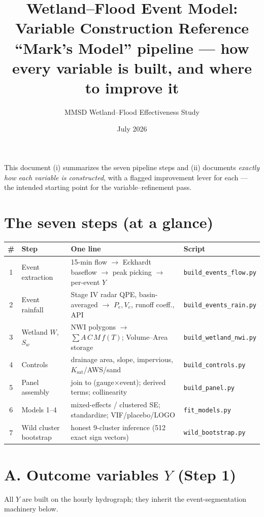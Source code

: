 \documentclass[11pt]{article}
\title{\textbf{Wetland--Flood Event Model: Variable Construction Reference}\\[3pt]
\large ``Mark's Model'' pipeline --- how every variable is built, and where to improve it}
\author{MMSD Wetland--Flood Effectiveness Study}
\date{July 2026}
\begin{document}
\maketitle
\vspace{-1.2em}
\noindent\small This document (i) summarizes the seven pipeline steps and (ii) documents
\emph{exactly how each variable is constructed}, with a flagged improvement lever for each ---
the intended starting point for the variable--refinement pass. \normalsize

\section{The seven steps (at a glance)}
\begin{table}[htbp]\centering\small
\begin{tabular}{clll}
\toprule
\# & Step & One line & Script \\
\midrule
1 & Event extraction & 15-min flow $\to$ Eckhardt baseflow $\to$ peak picking $\to$ per-event $Y$ & \texttt{build\_events\_flow.py} \\
2 & Event rainfall & Stage IV radar QPE, basin-averaged $\to$ $P_e,V_e$, runoff coeff., API & \texttt{build\_events\_rain.py} \\
3 & Wetland $W$, $S_w$ & NWI polygons $\to$ $\sum A\,C\,M\,f(T)$; Volume--Area storage & \texttt{build\_wetland\_nwi.py} \\
4 & Controls & drainage area, slope, impervious, $K_{\text{sat}}$/AWS/sand & \texttt{build\_controls.py} \\
5 & Panel assembly & join to (gauge$\times$event); derived terms; collinearity & \texttt{build\_panel.py} \\
6 & Models 1--4 & mixed-effects / clustered SE; standardize; VIF/placebo/LOGO & \texttt{fit\_models.py} \\
7 & Wild cluster bootstrap & honest 9-cluster inference (512 exact sign vectors) & \texttt{wild\_bootstrap.py} \\
\bottomrule
\end{tabular}
\end{table}

\section{A. Outcome variables $Y$ (Step 1)}
All $Y$ are built on the hourly hydrograph; they inherit the event-segmentation machinery below.
\end{document}
